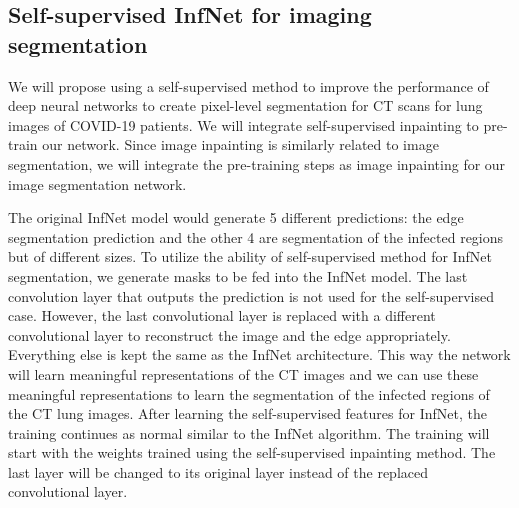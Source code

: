 \subsection{Self-supervised InfNet for imaging segmentation}

We will propose using a self-supervised method to improve the performance of deep neural networks to create pixel-level segmentation for CT scans for lung images of COVID-19 patients. We will integrate self-supervised inpainting to pre-train our network. Since image inpainting is similarly related to image segmentation, we will integrate the pre-training steps as image inpainting for our image segmentation network. 

The original InfNet model would generate 5 different predictions: the edge segmentation prediction and the other 4 are segmentation of the infected regions but of different sizes. To utilize the ability of self-supervised method for InfNet segmentation, we generate masks to be fed into the InfNet model. The last convolution layer that outputs the prediction is not used for the self-supervised case. However, the last convolutional layer is replaced with a different convolutional layer to reconstruct the image and the edge appropriately. Everything else is kept the same as the InfNet architecture. This way the network will learn meaningful representations of the CT images and we can use these meaningful representations to learn the segmentation of the infected regions of the CT lung images. After learning the self-supervised features for InfNet, the training continues as normal similar to the InfNet algorithm. The training will start with the weights trained using the self-supervised inpainting method. The last layer will be changed to its original layer instead of the replaced convolutional layer. 


